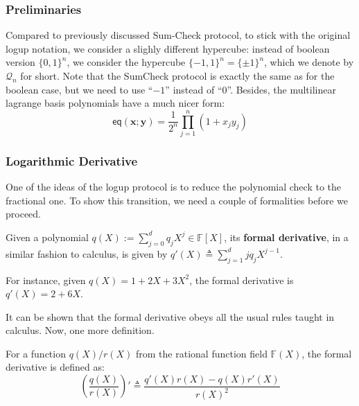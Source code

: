 \subsubsection{Preliminaries}

Compared to previously discussed Sum-Check protocol, to stick with the original
logup notation, we consider a slighly different hypercube: instead of boolean
version $\{0,1\}^n$, we consider the hypercube $\{-1,1\}^n=\{\pm 1\}^n$, which
we denote by $\mathcal{Q}_n$ for short. Note that the SumCheck protocol is
exactly the same as for the boolean case, but we need to use ``$-1$'' instead of
``$0$''. Besides, the multilinear lagrange basis polynomials have a much 
nicer form:
\begin{equation*}
    \mathsf{eq}(\mathbf{x};\mathbf{y}) = \frac{1}{2^n}\prod_{j=1}^n (1+x_jy_j)
\end{equation*}

\subsubsection{Logarithmic Derivative}

One of the ideas of the logup protocol is to reduce the polynomial check 
to the fractional one. To show this transition, we need a couple of formalities 
before we proceed.

\begin{definition}
    Given a polynomial $q(X) := \sum_{j=0}^d q_jX^j \in \mathbb{F}[X]$, its
    \textbf{formal derivative}, in a similar fashion to calculus, is given by
    $q'(X) \triangleq \sum_{j=1}^{d}jq_jX^{j-1}$.
\end{definition}

\begin{example}
    For instance, given $q(X)=1+2X+3X^2$, the formal derivative is $q'(X)=2+6X$.
\end{example}

It can be shown that the formal derivative obeys all the usual rules taught 
in calculus. Now, one more definition.
\begin{definition}
    For a function $q(X)/r(X)$ from the rational function field $\mathbb{F}(X)$, the 
    formal derivative is defined as:
    \begin{equation*}
        \left(\frac{q(X)}{r(X)}\right)' \triangleq \frac{q'(X)r(X)-q(X)r'(X)}{r(X)^2}
    \end{equation*}
\end{definition}

